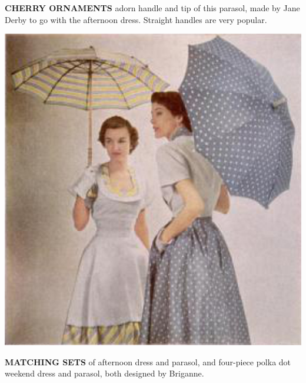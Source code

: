 \begin{minipage}{1.05\textwidth}
{\begin{minipage}[t]{0.87\textwidth}
\begin{minipage}[t]{0.41\textwidth}
\noindent \footnotesize\textbf{CHERRY ORNAMENTS} adorn handle and tip of this parasol, made by Jane Derby to go with the afternoon dress. Straight handles are very popular.
\end{minipage}\hspace{0.5cm}
\begin{minipage}[t]{0.4\textwidth}
   \includegraphics[width=1\textwidth]{./images/parasol-07.jpg}\par
\noindent \footnotesize\textbf{MATCHING SETS} of afternoon dress
and parasol, and four-piece polka dot weekend dress and parasol,
both designed by Briganne.
\end{minipage}
\end{minipage}
}

\vfill

\end{minipage}





